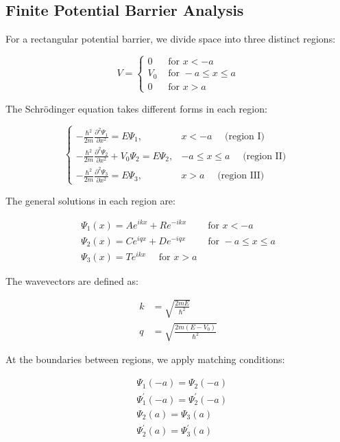 \documentclass[italian]{HKNdocument}
\begin{document}
\subsection{Finite Potential Barrier Analysis}

For a rectangular potential barrier, we divide space into three distinct regions:

\[
V= \begin{cases}0 & \text { for } x<-a  \label{eq:6.50}\\ V_{0} & \text { for }-a \leq x \leq a \\ 0 & \text { for } x>a\end{cases}
\]

The Schrödinger equation takes different forms in each region:

\[
\begin{cases}-\frac{\hbar^{2}}{2 m} \frac{\partial^{2} \Psi_{1}}{\partial x^{2}}=E \Psi_{1}, & x<-a \quad \text { (region I) }  \label{eq:6.51}\\ -\frac{\hbar^{2}}{2 m} \frac{\partial^{2} \Psi_{2}}{\partial x^{2}}+V_{0} \Psi_{2}=E \Psi_{2}, & -a \leq x \leq a \quad \text { (region II) } \\ -\frac{\hbar^{2}}{2 m} \frac{\partial^{2} \Psi_{3}}{\partial x^{2}}=E \Psi_{3}, & x>a \quad \text { (region III) }\end{cases}
\]

The general solutions in each region are:

\[
\begin{array}{ll}
\Psi_{1}(x)=A e^{i k x}+R e^{-i k x} & \text { for } x<-a \\
\Psi_{2}(x)=C e^{i q x}+D e^{-i q x} & \text { for }-a \leq x \leq a  \label{eq:6.52}\\
\Psi_{3}(x)=T e^{i k x} \quad \text { for } x>a &
\end{array}
\]

The wavevectors are defined as:

\begin{align}
k & =\sqrt{\frac{2 m E}{\hbar^{2}}} \\
q & =\sqrt{\frac{2 m\left(E-V_{0}\right)}{\hbar^{2}}} \label{eq:6.53}
\end{align}

At the boundaries between regions, we apply matching conditions:

\begin{align}
& \Psi_{1}(-a)=\Psi_{2}(-a) \\
& \Psi_{1}^{\prime}(-a)=\Psi_{2}^{\prime}(-a) \\
& \Psi_{2}(a)=\Psi_{3}(a)  \label{eq:6.54}\\
& \Psi_{2}^{\prime}(a)=\Psi_{3}^{\prime}(a)
\end{align}
\end{document}

